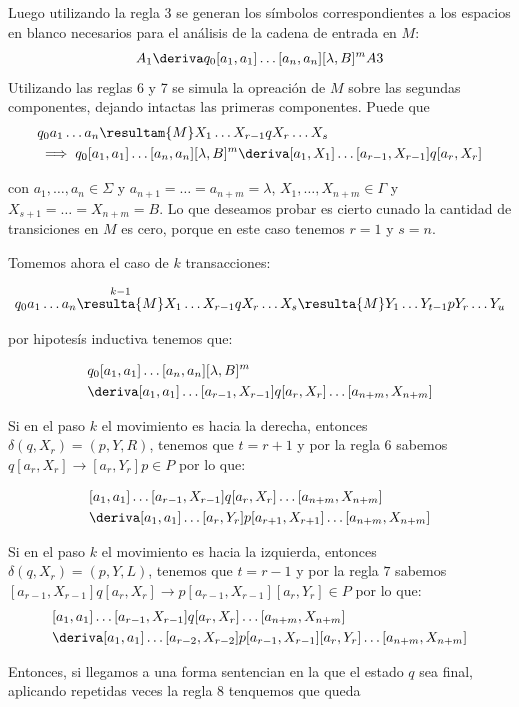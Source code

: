 \begin{demoPart}[0.8\textwidth]
  Luego utilizando la regla 3 se generan los símbolos correspondientes a los espacios en blanco necesarios para el análisis de la cadena de entrada en \(M\): \[A_1\deriva q_0[a_1,a_1]\dots[a_n,a_n][\lambda, B]^mA3\]
  Utilizando las reglas 6 y 7 se simula la opreación de \(M\) sobre las segundas componentes, dejando intactas las primeras componentes. Puede  que
  \begin{align*}
     & q_0a_1\dots a_n\resultam{M} X_1\dots X_{r-1}qX_r\dots X_s \\ &\implies q_0[a_1,a_1]\dots[a_n,a_n][\lambda, B]^m \deriva [a_1, X_1]\dots[a_{r-1},X_{r-1}]q[a_r, X_r]
  \end{align*}

  con \(a_1,\dots,a_n\in\Sigma\) y \(a_{n+1} = \dots = a_{n+m} = \lambda \), \(X_1,\dots, X_{n+m}\in\Gamma\) y \(X_{s+1} =\dots = X_{n+m} = B\). Lo que deseamos probar es cierto cunado la cantidad de transiciones en \(M\) es cero, porque en este caso tenemos \(r =1\) y \(s = n\).

  Tomemos ahora el caso de \(k\) transacciones:

  \[ q_0a_1\dots a_n\overset{k-1}{\resulta{M}} X_1\dots X_{r-1}qX_r\dots X_s \resulta{M} Y_1\dots Y_{t-1}pY_r\dots Y_u \]

  por hipotesís inductiva tenemos que:

  \begin{align*}
     & q_0[a_1,a_1]\dots[a_n,a_n][\lambda, B]^m                                   \\
     & \deriva [a_1, a_1]\dots[a_{r-1},X_{r-1}]q[a_r, X_r]\dots[a_{n+m}, X_{n+m}]
  \end{align*}

  Si en el paso \(k\) el movimiento es hacia la derecha, entonces \(\delta(q,X_r) = (p, Y, R)\), tenemos que \(t=r+1\) y por la regla \(6\) sabemos \(q[a_r,X_r]\to[a_r, Y_r]p \in P\) por lo que:

  \begin{align*}
     & [a_1, a_1]\dots[a_{r-1},X_{r-1}]q[a_r, X_r]\dots[a_{n+m}, X_{n+m}]          \\
     & \deriva [a_1, a_1]\dots[a_r, Y_r]p[a_{r+1}, X_{r+1}]\dots[a_{n+m}, X_{n+m}]
  \end{align*}

  Si en el paso \(k\) el movimiento es hacia la izquierda, entonces \(\delta(q,X_r) = (p, Y, L)\), tenemos que \(t=r-1\) y por la regla \(7\) sabemos \([a_{r-1},X_{r-1}]q[a_r,X_r]\to p[a_{r-1},X_{r-1}][a_r,Y_r] \in P\) por lo que:
  \begin{align*}
     & [a_1, a_1]\dots[a_{r-1},X_{r-1}]q[a_r, X_r]\dots[a_{n+m}, X_{n+m}]                          \\
     & \deriva [a_1, a_1]\dots[a_{r-2}, X_{r-2}]p[a_{r-1},X_{r-1}][a_r,Y_r]\dots[a_{n+m}, X_{n+m}]
  \end{align*}

  Entonces, si llegamos a una forma sentencian en la que el estado \(q\) sea final, aplicando repetidas veces la regla 8 tenquemos que queda
\end{demoPart}

